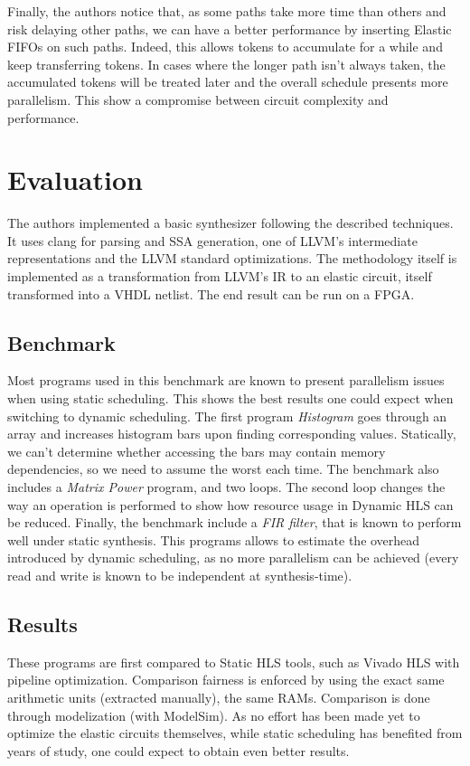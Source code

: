 \documentclass{article}
\begin{document}
Finally, the authors notice that, as some paths take more time than others and risk delaying other paths, we can have a better performance by inserting Elastic FIFOs on such paths. Indeed, this allows tokens to accumulate for a while and keep transferring tokens. In cases where the longer path isn't always taken, the accumulated tokens will be treated later and the overall schedule presents more parallelism. This show a compromise between circuit complexity and performance.


\section{Evaluation}
The authors implemented a basic synthesizer following the described techniques.
It uses clang for parsing and SSA generation, one of LLVM's intermediate representations and the LLVM standard optimizations.
The methodology itself is implemented as a transformation from LLVM's IR to an elastic circuit, itself transformed into a VHDL netlist. The end result can be run on a FPGA.

\subsection{Benchmark}
Most programs used in this benchmark are known to present parallelism issues when using static scheduling. This shows the best results one could expect when switching to dynamic scheduling.
The first program \textit{Histogram} goes through an array and increases histogram bars upon finding corresponding values. Statically, we can't determine whether accessing the bars may contain memory dependencies, so we need to assume the worst each time.
The benchmark also includes a \textit{Matrix Power} program, and two loops. The second loop changes the way an operation is performed to show how resource usage in Dynamic HLS can be reduced.
Finally, the benchmark include a \textit{FIR filter}, that is known to perform well under static synthesis. This programs allows to estimate the overhead introduced by dynamic scheduling, as no more parallelism can be achieved (every read and write is known to be independent at synthesis-time).

\subsection{Results}
These programs are first compared to Static HLS tools, such as Vivado HLS with pipeline optimization. Comparison fairness is enforced by using the exact same arithmetic units (extracted manually), the same RAMs.
Comparison is done through modelization (with ModelSim).
As no effort has been made yet to optimize the elastic circuits themselves, while static scheduling has benefited from years of study, one could expect to obtain even better results.
\end{document}

